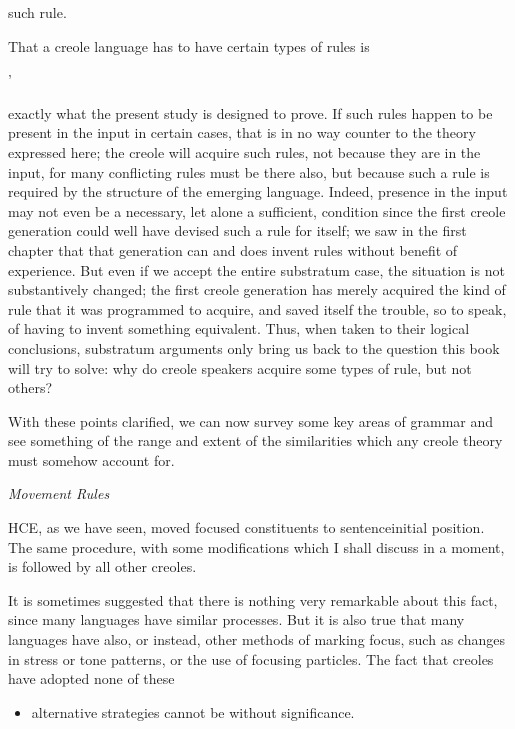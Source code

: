 such rule.

That a creole language has to have certain types of rules is

'


exactly what the present study is designed to prove. If such rules happen to be present in the input in certain cases, that is in no way counter to the theory expressed here; the creole will acquire such rules, not because they are in the input, for many conflicting rules must be there also, but because such a rule is required by the struc\-ture of the emerging language. Indeed, presence in the input may not even be a necessary, let alone a sufficient, condition since the first creole generation could well have devised such a rule for itself; we saw in the first chapter that that generation can and does invent rules without benefit of experience. But even if we accept the entire sub\-stratum case, the situation is not substantively changed; the first creole generation has merely acquired the kind of rule that it was programmed to acquire, and saved itself the trouble, so to speak, of having to invent something equivalent. Thus, when taken to their logical conclusions, substratum arguments only bring us back to the question this book will try to solve: why do creole speakers acquire some types of rule, but not others?

With these points clarified, we can now survey some key areas of grammar and see something of the range and extent of the similarities which any creole theory must somehow account for.

\textit{Movement Rules}

HCE, as we have seen, moved focused constituents to sentence\-initial position. The same procedure, with some modifications which I shall discuss in a moment, is followed by all other creoles.

It is sometimes suggested that there is nothing very remarkable about this fact, since many languages have similar processes. But it is also true that many languages have also, or instead, other methods of marking focus, such as changes in stress or tone patterns, or the use of focusing particles. The fact that creoles have adopted none of these

\begin{itemize}
\item alternative strategies cannot be without significance.
\end{itemize}


